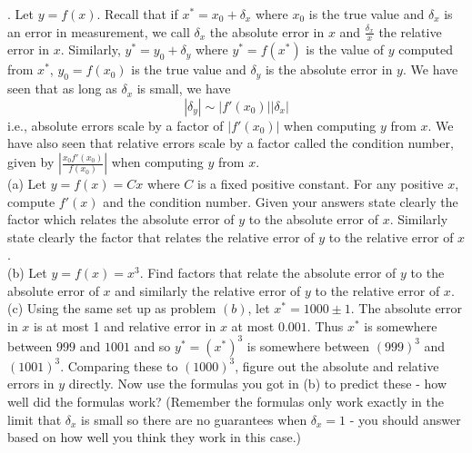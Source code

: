 \documentclass[12 pt]{article}
\begin{document}
\medskip

. Let $y=f(x)$. Recall that if $x^*=x_0 + \delta_x$ where $x_0$ is the true value and $\delta_x$ is an error in measurement, we call 
$\delta_x$ the absolute error in $x$ and $\frac{\delta_x}{ x}$ the relative error in $x$.
Similarly, $y^*=y_0 + \delta_y$ where $y^*=f(x^*)$ is the value of $y$ computed from $x^*$, $y_0=f(x_0)$ is the true value and $\delta_y$ is the absolute error in $y$. We have seen that as long 
as $\delta_x$ is small, we have 
$$
|\delta_y| \sim |f'(x_0)| |\delta_x|
$$
i.e., absolute errors scale by a factor of $|f'(x_0)|$ when computing $y$ from $x$. 
We have also seen that relative errors scale by a factor called the condition number, given by $|\frac{x_0 f'(x_0)}{f(x_0)}|$ when computing $y$ from $x$. \\
(a) Let $y=f(x)=Cx$ where $C$ is a fixed positive constant. For any positive $x$, compute $f'(x)$ and the condition number. Given your answers state 
clearly the factor which relates the absolute error of $y$ to the absolute error of $x$. Similarly state clearly the factor that relates 
the relative error of $y$ to the relative error of $x$. \\
(b) Let $y=f(x)=x^3$. Find factors that relate the absolute error of $y$ to the absolute error of $x$ and similarly the relative error of $y$ to the relative error 
of $x$. \\
(c) Using the same set up as problem $(b)$, let $x^* = 1000 \pm 1$. The absolute error in $x$ is at most 1 and relative error in $x$ at most $0.001$. Thus $x^*$ is somewhere between $999$ and $1001$ and so 
$y^*=(x^*)^3$ is somewhere between $(999)^3$ and $(1001)^3$. Comparing these to $(1000)^3$, figure out the absolute and relative errors in $y$ 
directly. Now use the formulas you got in (b) to predict these - how well did the formulas work? (Remember the formulas only work exactly 
in the limit that $\delta_x$ is small so there are no guarantees when $\delta_x =1$ - you should answer based on how well you think they work in this case.)


 
\end{document}
